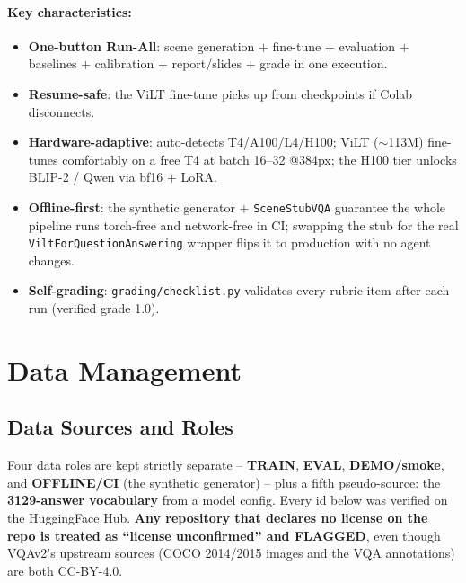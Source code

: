 \documentclass[12pt,a4paper]{article}
\begin{document}
\paragraph{Key characteristics:}
\begin{itemize}\setlength\itemsep{0.15em}
  \item \textbf{One-button Run-All}: scene generation $+$ fine-tune $+$ evaluation $+$ baselines $+$ calibration $+$ report/slides $+$ grade in one execution.
  \item \textbf{Resume-safe}: the ViLT fine-tune picks up from checkpoints if Colab disconnects.
  \item \textbf{Hardware-adaptive}: auto-detects T4/A100/L4/H100; ViLT ($\sim$113M) fine-tunes comfortably on a free T4 at batch 16--32 @384px; the H100 tier unlocks BLIP-2 / Qwen via bf16 $+$ LoRA.
  \item \textbf{Offline-first}: the synthetic generator $+$ \texttt{SceneStubVQA} guarantee the whole pipeline runs torch-free and network-free in CI; swapping the stub for the real \texttt{ViltForQuestionAnswering} wrapper flips it to production with no agent changes.
  \item \textbf{Self-grading}: \texttt{grading/checklist.py} validates every rubric item after each run (verified grade 1.0).
\end{itemize}

\section{Data Management}

\subsection{Data Sources and Roles}

Four data roles are kept strictly separate -- \textbf{TRAIN}, \textbf{EVAL}, \textbf{DEMO/smoke}, and \textbf{OFFLINE/CI} (the synthetic generator) -- plus a fifth pseudo-source: the \textbf{3129-answer vocabulary} from a model config. Every id below was verified on the HuggingFace Hub. \textbf{Any repository that declares no license on the repo is treated as ``license unconfirmed'' and FLAGGED}, even though VQAv2's upstream sources (COCO 2014/2015 images and the VQA annotations) are both CC-BY-4.0.
\end{document}
